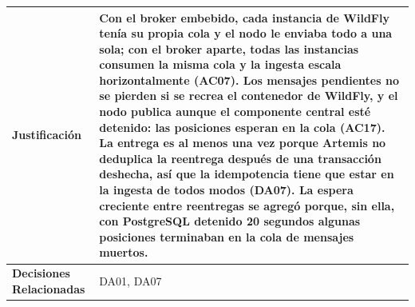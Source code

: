 \begin{table}[H]
\begin{tabular}{|p{4.1cm}|p{11.7cm}|}
        \hline
            \textbf{Justificación} & Con el broker embebido, cada instancia de WildFly tenía su propia cola y el nodo le enviaba todo a una sola; con el broker aparte, todas las instancias consumen la misma cola y la ingesta escala horizontalmente (AC07). Los mensajes pendientes no se pierden si se recrea el contenedor de WildFly, y el nodo publica aunque el componente central esté detenido: las posiciones esperan en la cola (AC17). La entrega es al menos una vez porque Artemis no deduplica la reentrega después de una transacción deshecha, así que la idempotencia tiene que estar en la ingesta de todos modos (DA07). La espera creciente entre reentregas se agregó porque, sin ella, con PostgreSQL detenido 20 segundos algunas posiciones terminaban en la cola de mensajes muertos. \\
        \hline
            \textbf{Decisiones Relacionadas} & DA01, DA07 \\
        \hline
    \end{tabular}
\end{table}

